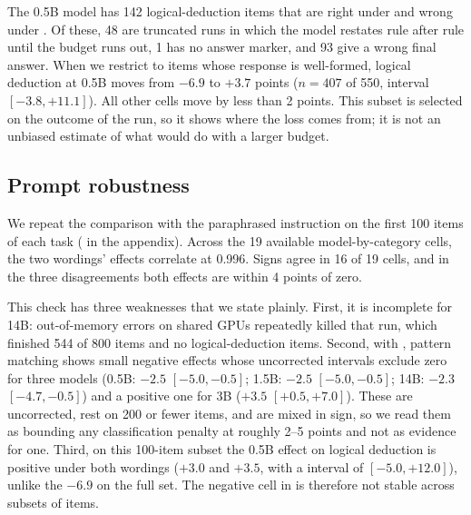 The 0.5B model has 142 logical-deduction items that are right under \direct and wrong under \CoT.
Of these, 48 are truncated runs in which the model restates rule after rule until the budget runs out, 1 has no answer marker, and 93 give a wrong final answer.
When we restrict to items whose \CoT response is well-formed, logical deduction at 0.5B moves from $-6.9$ to $+3.7$ points ($n = 407$ of 550, interval $[-3.8, +11.1]$).
All other cells move by less than 2 points.
This subset is selected on the outcome of the \CoT run, so it shows where the loss comes from; it is not an unbiased estimate of what \CoT would do with a larger budget.

\subsection{Prompt robustness}
\label{sec:robust}

We repeat the comparison with the paraphrased instruction \cottwo on the first 100 items of each task ( in the appendix).
Across the 19 available model-by-category cells, the two wordings' effects correlate at 0.996.
Signs agree in 16 of 19 cells, and in the three disagreements both effects are within 4 points of zero.

This check has three weaknesses that we state plainly.
First, it is incomplete for 14B: out-of-memory errors on shared GPUs repeatedly killed that run, which finished 544 of 800 items and no logical-deduction items.
Second, with \cottwo, pattern matching shows small negative effects whose uncorrected intervals exclude zero for three models (0.5B: $-2.5$ $[-5.0, -0.5]$; 1.5B: $-2.5$ $[-5.0, -0.5]$; 14B: $-2.3$ $[-4.7, -0.5]$) and a positive one for 3B ($+3.5$ $[+0.5, +7.0]$).
These are uncorrected, rest on 200 or fewer items, and are mixed in sign, so we read them as bounding any classification penalty at roughly 2--5 points and not as evidence for one.
Third, on this 100-item subset the 0.5B effect on logical deduction is positive under both wordings ($+3.0$ and $+3.5$, with a \cottwo interval of $[-5.0, +12.0]$), unlike the $-6.9$ on the full set.
The negative cell in  is therefore not stable across subsets of items.
